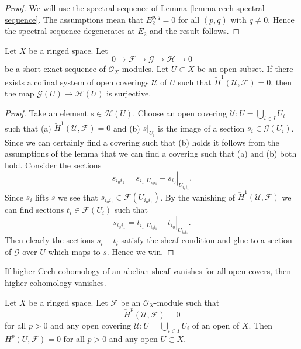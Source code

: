 \begin{proof}
We will use the spectral sequence of
Lemma \ref{lemma-cech-spectral-sequence}.
The assumptions mean that $E_2^{p, q} = 0$ for all $(p, q)$ with
$q \not = 0$. Hence the spectral sequence degenerates at $E_2$
and the result follows.
\end{proof}

\begin{lemma}
\label{lemma-ses-cech-h1}
Let $X$ be a ringed space.
Let
$$
0 \to \mathcal{F} \to \mathcal{G} \to \mathcal{H} \to 0
$$
be a short exact sequence of $\mathcal{O}_X$-modules.
Let $U \subset X$ be an open subset.
If there exists a cofinal system of open coverings $\mathcal{U}$
of $U$ such that $\check{H}^1(\mathcal{U}, \mathcal{F}) = 0$,
then the map $\mathcal{G}(U) \to \mathcal{H}(U)$ is
surjective.
\end{lemma}

\begin{proof}
Take an element $s \in \mathcal{H}(U)$. Choose an open covering
$\mathcal{U} : U = \bigcup_{i \in I} U_i$ such that
(a) $\check{H}^1(\mathcal{U}, \mathcal{F}) = 0$ and (b)
$s|_{U_i}$ is the image of a section $s_i \in \mathcal{G}(U_i)$.
Since we can certainly find a covering such that (b) holds
it follows from the assumptions of the lemma that we can find
a covering such that (a) and (b) both hold.
Consider the sections
$$
s_{i_0i_1} = s_{i_1}|_{U_{i_0i_1}} - s_{i_0}|_{U_{i_0i_1}}.
$$
Since $s_i$ lifts $s$ we see that $s_{i_0i_1} \in \mathcal{F}(U_{i_0i_1})$.
By the vanishing of $\check{H}^1(\mathcal{U}, \mathcal{F})$ we can
find sections $t_i \in \mathcal{F}(U_i)$ such that
$$
s_{i_0i_1} = t_{i_1}|_{U_{i_0i_1}} - t_{i_0}|_{U_{i_0i_1}}.
$$
Then clearly the sections $s_i - t_i$ satisfy the sheaf condition
and glue to a section of $\mathcal{G}$ over $U$ which maps to $s$.
Hence we win.
\end{proof}

\begin{lemma}
\label{lemma-cech-vanish}
\begin{slogan}
If higher Cech cohomology of an abelian sheaf vanishes for all open covers,
then higher cohomology vanishes.
\end{slogan}
Let $X$ be a ringed space.
Let $\mathcal{F}$ be an $\mathcal{O}_X$-module such that
$$
\check{H}^p(\mathcal{U}, \mathcal{F}) = 0
$$
for all $p > 0$ and any open covering $\mathcal{U} : U = \bigcup_{i \in I} U_i$
of an open of $X$. Then $H^p(U, \mathcal{F}) = 0$ for all $p > 0$
and any open $U \subset X$.
\end{lemma}

